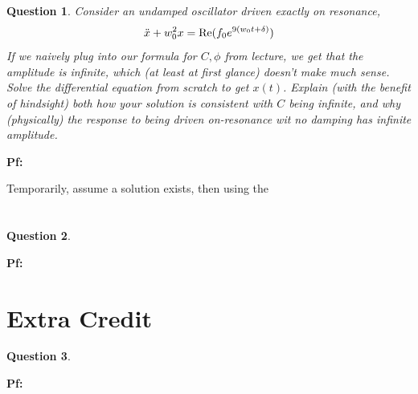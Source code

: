 \documentclass{article}
\newtheorem{question}{Question}
\newcommand{\Real}{\textmd{Re}}
\begin{document}
\break

\section{}
\begin{question}\label{q5}
    Consider an \emph{undamped oscillator} driven exactly on resonance,
    $$\ddot x+w_0^2 x=\Real(f_0e^{9(w_0t+\delta)})$$
    If we naively plug into our formula for $C,\phi$ from lecture, we get that the amplitude is infinite, which (at least at first glance) doesn't make much sense. Solve the differential equation from scratch to get $x(t)$. Explain (with the benefit of hindsight) both how your solution is consistent with $C$ being infinite, and why (physically) the response to being driven on-resonance wit no damping has infinite amplitude.
\end{question}

\textbf{Pf:}

Temporarily, assume a solution exists, then using the 

\break

\section{}
\begin{question}\label{q6}
\end{question}

\textbf{Pf:}

\break

\section{Extra Credit}
\begin{question}\label{q7}
\end{question}

\textbf{Pf:}

\break
\end{document}
